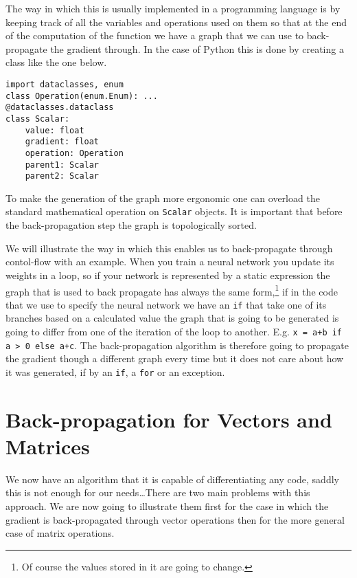 \documentclass{article}
\begin{document}
The way in which this is usually implemented in a programming language is by
keeping track of all the variables and operations used on them so that at the
end of the computation of the function we have a graph that we can use to
back-propagate the gradient through. In the case of Python this is done by
creating a class like the one below.

\begin{verbatim}
import dataclasses, enum
class Operation(enum.Enum): ...
@dataclasses.dataclass
class Scalar:
    value: float
    gradient: float
    operation: Operation
    parent1: Scalar
    parent2: Scalar
\end{verbatim}

To make the generation of the graph more ergonomic one can overload the standard
mathematical operation on \texttt{Scalar} objects. It is important that before
the back-propagation step the graph is topologically sorted.

We will illustrate the way in which this enables us to back-propagate through
contol-flow with an example. When you train a neural network you update its
weights in a loop, so if your network is represented by a static expression the
graph that is used to back propagate has always the same form,\footnote {Of
course the values stored in it are going to change.} if in the code that we use
to specify the neural network we have an \texttt{if} that take one of its
branches based on a calculated value the graph that is going to be generated is
going to differ from one of the iteration of the loop to another. E.g. \texttt
{x = a+b if a > 0 else a+c}. The back-propagation algorithm is therefore going
to propagate the gradient though a different graph every time but it does not
care about how it was generated, if by an \texttt{if}, a \texttt{for} or an
exception.

\section{Back-propagation for Vectors and Matrices}

We now have an algorithm that it is capable of differentiating any code, saddly
this is not enough for our needs\dots There are two main problems with this
approach. We are now going to illustrate them first for the case in which the
gradient is back-propagated through vector operations then for the more general
case of matrix operations.
\end{document}

